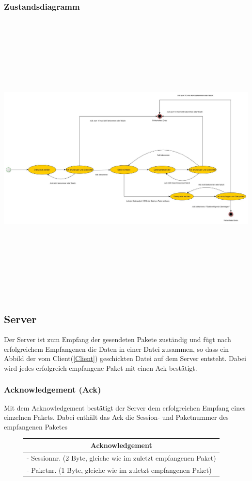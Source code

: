 \documentclass[a4paper, 12pt]{scrartcl}
\begin{document}
\begin{landscape}
\subsubsection{Zustandsdiagramm}
\includegraphics[height=15cm,width=24cm]{zustandsdiagram_client.jpg}
\end{landscape}
\subsection{Server}
Der Server ist zum Empfang der gesendeten Pakete zuständig und fügt nach erfolgreichem Empfangenen die Daten in einer Datei zusammen, so dass ein Abbild der vom Client(\ref{Client}) geschickten Datei auf dem Server entsteht. Dabei wird jedes erfolgreich empfangene Paket mit einen Ack bestätigt.
\subsubsection{Acknowledgement (Ack)} \label{ACK}
Mit dem Acknowledgement bestätigt der Server dem erfolgreichen Empfang eines einzelnen Pakets. Dabei enthält das Ack die Session- und Paketnummer des empfangenen Paketes  
\begin{figure}[h]
	\centering
		\begin{tabular}{|l|}
		\hline		
		\multicolumn{1}{|c|}{Acknowledgement}\\
		\hline \hline
		- Sessionnr. (2 Byte, gleiche wie im zuletzt empfangenen Paket)\\
		- Paketnr.   (1 Byte, gleiche wie im zuletzt empfangenen Paket)\\
		\hline
		\end{tabular}
\end{figure}
\end{document}
